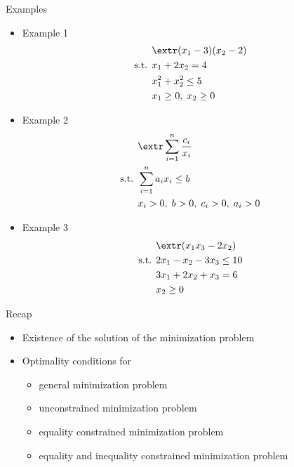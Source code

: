 \documentclass[12pt]{beamer}
\begin{document}
\begin{frame}{Examples}
\begin{itemize}
\small
\item Example 1
\vspace{-5mm}
\begin{equation*}
\begin{split}
& \extr (x_1 - 3)(x_2 - 2)\\
\text{s.t. } & x_1 + 2x_2 = 4\\
& x^2_1 + x^2_2 \leq 5\\
& x_1 \geq 0, \; x_2 \geq 0 
\end{split}
\end{equation*} 
\vspace{-5mm}
\item Example 2
\vspace{-5mm}
\begin{equation*}
\begin{split}
& \extr \sum\limits_{i=1}^n \frac{c_i}{x_i}\\
\text{s.t. } & \sum\limits_{i=1}^n a_ix_i \leq b\\
& x_i > 0, \; b > 0, \; c_i > 0, \; a_i > 0
\end{split}
\end{equation*}
\vspace{-4mm}
\item Example 3
\vspace{-3mm}
\begin{equation*}
\begin{split}
& \extr (x_1x_3 - 2x_2)\\
\text{s.t. } & 2x_1 - x_2 - 3x_3 \leq 10\\
& 3x_1 + 2x_2 + x_3 = 6\\
& x_2 \geq 0
\end{split}
\end{equation*}
\end{itemize}
\end{frame}

\begin{frame}{Recap}
\begin{itemize}
\item Existence of the solution of the minimization problem
\item Optimality conditions for
\begin{itemize}
\item general minimization problem
\item unconstrained minimization problem
\item equality constrained minimization problem 
\item equality and inequality constrained minimization problem
\end{itemize}
\end{itemize}
\end{frame}
\end{document}
